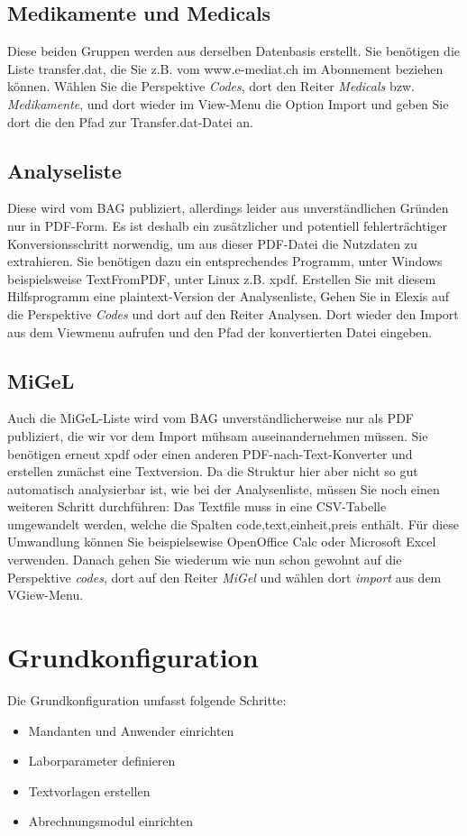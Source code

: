 \subsection{Medikamente und Medicals}
Diese beiden Gruppen werden aus derselben Datenbasis erstellt. Sie benötigen die Liste transfer.dat, die Sie z.B. vom www.e-mediat.ch im Abonnement beziehen können. Wählen Sie die Perspektive \textit{Codes}, dort den Reiter \textit{Medicals} bzw. \textit{Medikamente}, und dort wieder im View-Menu die Option Import und geben Sie dort die den Pfad zur Transfer.dat-Datei an.
\subsection{Analyseliste}
Diese wird vom BAG publiziert, allerdings leider aus unverständlichen Gründen nur in PDF-Form. Es ist deshalb ein zusätzlicher und potentiell fehlerträchtiger Konversionsschritt norwendig, um aus dieser PDF-Datei die Nutzdaten zu extrahieren. Sie benötigen dazu ein entsprechendes Programm, unter Windows beispielsweise TextFromPDF, unter Linux z.B. xpdf. Erstellen Sie mit diesem Hilfsprogramm eine plaintext-Version der Analysenliste, Gehen Sie in Elexis auf die Perspektive \textit{Codes} und dort auf den Reiter Analysen. Dort wieder den Import aus dem Viewmenu aufrufen und den Pfad der konvertierten Datei eingeben.
\subsection{MiGeL}
Auch die MiGeL-Liste wird vom BAG unverständlicherweise nur als PDF publiziert, die wir vor dem Import mühsam auseinandernehmen müssen. Sie benötigen erneut xpdf oder einen anderen PDF-nach-Text-Konverter und erstellen zunächst eine Textversion. Da die Struktur hier aber nicht so gut automatisch analysierbar ist, wie bei der Analysenliste, müssen Sie noch einen weiteren Schritt durchführen: Das Textfile muss in eine CSV-Tabelle umgewandelt werden, welche die Spalten code,text,einheit,preis enthält. Für diese Umwandlung können Sie beispielsewise OpenOffice Calc oder Microsoft Excel verwenden. Danach gehen Sie wiederum wie nun schon gewohnt auf die Perspektive \textit{codes}, dort auf den Reiter \textit{MiGel} und wählen dort \textit{import} aus dem VGiew-Menu.

\section{Grundkonfiguration}
\label{grundkonfiguration}
Die Grundkonfiguration umfasst folgende Schritte:
\begin{itemize}
  \item Mandanten und Anwender einrichten
  \item Laborparameter definieren
  \item Textvorlagen erstellen
  \item Abrechnungsmodul einrichten
\end{itemize}
